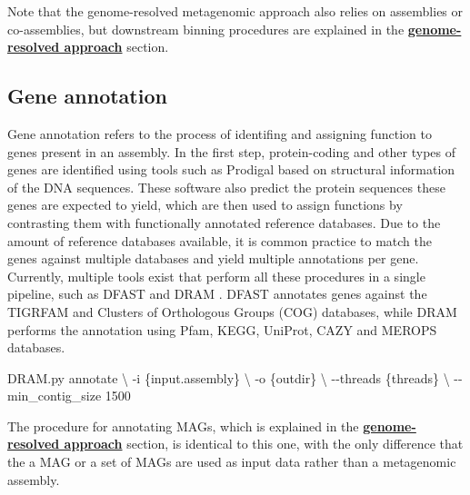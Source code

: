 \documentclass[
]{book}
\newenvironment{Shaded}{\begin{snugshade}}{\end{snugshade}}
\newcommand{\AttributeTok}[1]{\textcolor[rgb]{0.13,0.29,0.53}{#1}}
\newcommand{\DataTypeTok}[1]{\textcolor[rgb]{0.13,0.29,0.53}{#1}}
\newcommand{\ExtensionTok}[1]{#1}
\newcommand{\NormalTok}[1]{#1}
\begin{document}
\normalsize

Note that the genome-resolved metagenomic approach also relies on assemblies or co-assemblies, but downstream binning procedures are explained in the \textbf{\protect\hyperlink{genome-resolved}{genome-resolved approach}} section.

\hypertarget{assembly-gene-annotation}{%
\subsection*{Gene annotation}\label{assembly-gene-annotation}}

Gene annotation refers to the process of identifing and assigning function to genes present in an assembly. In the first step, protein-coding and other types of genes are identified using tools such as Prodigal based on structural information of the DNA sequences. These software also predict the protein sequences these genes are expected to yield, which are then used to assign functions by contrasting them with functionally annotated reference databases. Due to the amount of reference databases available, it is common practice to match the genes against multiple databases and yield multiple annotations per gene. Currently, multiple tools exist that perform all these procedures in a single pipeline, such as DFAST \citep{Tanizawa2017-uy} and DRAM \citep{Shaffer2020-kp}. DFAST annotates genes against the TIGRFAM and Clusters of Orthologous Groups (COG) databases, while DRAM performs the annotation using Pfam, KEGG, UniProt, CAZY and MEROPS databases.

\small

\begin{Shaded}
\begin{Highlighting}[]
\ExtensionTok{DRAM.py}\NormalTok{ annotate }\DataTypeTok{\textbackslash{}}
      \AttributeTok{{-}i}\NormalTok{ \{input.assembly\} }\DataTypeTok{\textbackslash{}}
      \AttributeTok{{-}o}\NormalTok{ \{outdir\} }\DataTypeTok{\textbackslash{}}
      \AttributeTok{{-}{-}threads}\NormalTok{ \{threads\} }\DataTypeTok{\textbackslash{}}
      \AttributeTok{{-}{-}min\_contig\_size}\NormalTok{ 1500}
\end{Highlighting}
\end{Shaded}

\normalsize

The procedure for annotating MAGs, which is explained in the \textbf{\protect\hyperlink{genome-resolved}{genome-resolved approach}} section, is identical to this one, with the only difference that the a MAG or a set of MAGs are used as input data rather than a metagenomic assembly.
\end{document}
